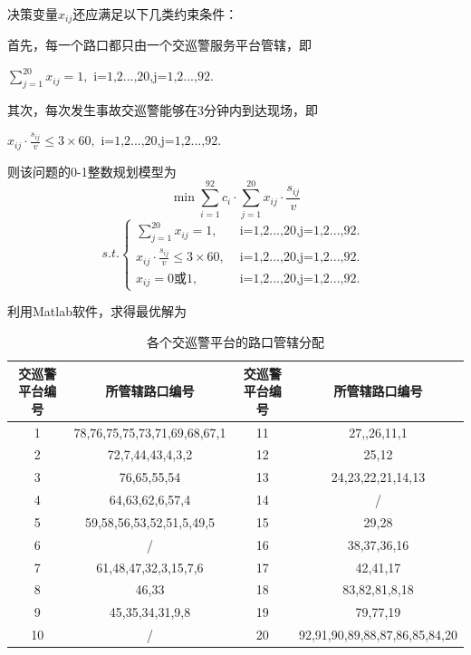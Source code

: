 \documentclass[withoutpreface,bwprint]{cumcmthesis} %
\begin{document}
	决策变量$x_{i j}$还应满足以下几类约束条件：
	
	首先，每一个路口都只由一个交巡警服务平台管辖，即
	\begin{center}
		$\sum_{j=1}^{20} x_{i j}=1, \text { i=1,2...,20,j=1,2...,92. }$
	\end{center}
	
	其次，每次发生事故交巡警能够在3分钟内到达现场，即
	\begin{center}
		$x_{i j} \cdot \frac{s_{i j}}{v} \leq 3×60, \text { i=1,2...,20,j=1,2...,92. }$
	\end{center}
	
	则该问题的0-1整数规划模型为
	\begin{equation}
		\min \sum_{i=1}^{92} c_i \cdot \sum_{j=1}^{20} x_{i j} \cdot \frac{s_{i j}}{v}
	\end{equation}
	\begin{equation}
		s.t. \left\{ \begin{array}{ll}
			\sum_{j=1}^{20} x_{i j}=1, & \text { i=1,2...,20,j=1,2...,92. }  \\
			x_{i j} \cdot \frac{s_{i j}}{v} \leq 3×60, & \text { i=1,2...,20,j=1,2...,92. } \\
			x_{i j} =0 \text{或1}, & \text { i=1,2...,20,j=1,2...,92. } 
		\end{array}\right.
	\end{equation}
	
	利用Matlab软件，求得最优解为\cite{Jiang2018}
	
	\begin{table}[!htbp]
		\centering
		\begin{tabular}{c c c c} %
			
			\toprule
			交巡警平台编号 & 所管辖路口编号 & 交巡警平台编号 & 所管辖路口编号 \\
			\midrule
			1 & 78,76,75,75,73,71,69,68,67,1 & 11 & 27,,26,11,1\\
			2 & 72,7,44,43,4,3,2 & 12 & 25,12\\
			3 & 76,65,55,54 & 13 & 24,23,22,21,14,13\\
			4 & 64,63,62,6,57,4 & 14 & / \\
			5 & 59,58,56,53,52,51,5,49,5 & 15 & 29,28\\
			6 & / & 16 & 38,37,36,16\\
			7 & 61,48,47,32,3,15,7,6 & 17 & 42,41,17\\
			8 & 46,33 & 18 & 83,82,81,8,18\\
			9 & 45,35,34,31,9,8 & 19 & 79,77,19\\
			10 & / & 20 & 92,91,90,89,88,87,86,85,84,20\\
			\bottomrule
		\end{tabular}
		\caption{各个交巡警平台的路口管辖分配}
	\end{table}
\end{document}
